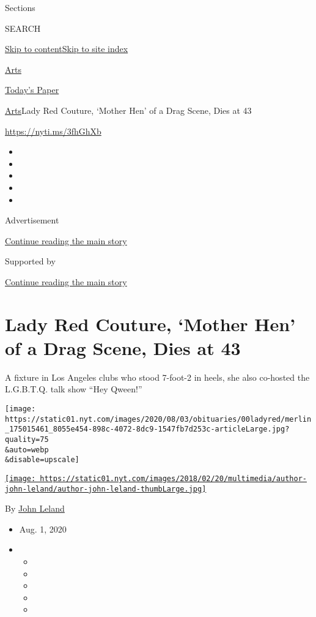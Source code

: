 Sections

SEARCH

\protect\hyperlink{site-content}{Skip to
content}\protect\hyperlink{site-index}{Skip to site index}

\href{https://www.nytimes.com/section/arts}{Arts}

\href{https://myaccount.nytimes.com/auth/login?response_type=cookie\&client_id=vi}{}

\href{https://www.nytimes.com/section/todayspaper}{Today's Paper}

\href{/section/arts}{Arts}\textbar{}Lady Red Couture, `Mother Hen' of a
Drag Scene, Dies at 43

\url{https://nyti.ms/3fhGhXb}

\begin{itemize}
\item
\item
\item
\item
\item
\end{itemize}

Advertisement

\protect\hyperlink{after-top}{Continue reading the main story}

Supported by

\protect\hyperlink{after-sponsor}{Continue reading the main story}

\hypertarget{lady-red-couture-mother-hen-of-a-drag-scene-dies-at-43}{%
\section{Lady Red Couture, `Mother Hen' of a Drag Scene, Dies at
43}\label{lady-red-couture-mother-hen-of-a-drag-scene-dies-at-43}}

A fixture in Los Angeles clubs who stood 7-foot-2 in heels, she also
co-hosted the L.G.B.T.Q. talk show ``Hey Qween!''

\texttt{[image: https://static01.nyt.com/images/2020/08/03/obituaries/00ladyred/merlin\_175015461\_8055e454-898c-4072-8dc9-1547fb7d253c-articleLarge.jpg?quality=75\\\&auto=webp\\\&disable=upscale]}

\href{https://www.nytimes.com/by/john-leland}{\texttt{[image: https://static01.nyt.com/images/2018/02/20/multimedia/author-john-leland/author-john-leland-thumbLarge.jpg]}}

By \href{https://www.nytimes.com/by/john-leland}{John Leland}

\begin{itemize}
\item
  Aug. 1, 2020
\item
  \begin{itemize}
  \item
  \item
  \item
  \item
  \item
  \end{itemize}
\end{itemize}

